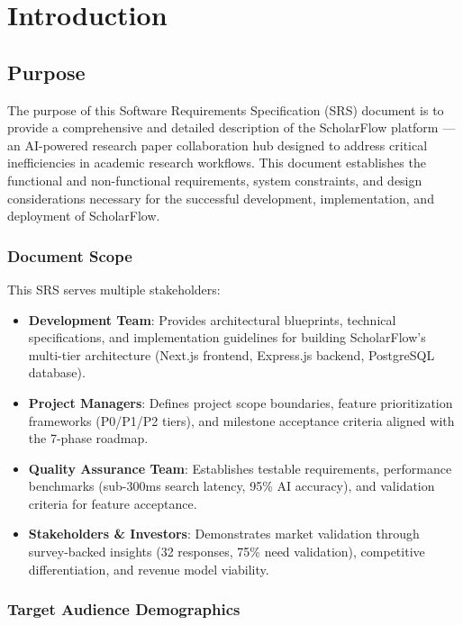 \chapter{Introduction}

\section{Purpose}

The purpose of this Software Requirements Specification (SRS) document is to provide a comprehensive and detailed description of the ScholarFlow platform --- an AI-powered research paper collaboration hub designed to address critical inefficiencies in academic research workflows. This document establishes the functional and non-functional requirements, system constraints, and design considerations necessary for the successful development, implementation, and deployment of ScholarFlow.

\subsection{Document Scope}

This SRS serves multiple stakeholders:

\begin{itemize}
    \item \textbf{Development Team}: Provides architectural blueprints, technical specifications, and implementation guidelines for building ScholarFlow's multi-tier architecture (Next.js frontend, Express.js backend, PostgreSQL database).
    \item \textbf{Project Managers}: Defines project scope boundaries, feature prioritization frameworks (P0/P1/P2 tiers), and milestone acceptance criteria aligned with the 7-phase roadmap.
    \item \textbf{Quality Assurance Team}: Establishes testable requirements, performance benchmarks (sub-300ms search latency, 95\% AI accuracy), and validation criteria for feature acceptance.
    \item \textbf{Stakeholders \& Investors}: Demonstrates market validation through survey-backed insights (32 responses, 75\% need validation), competitive differentiation, and revenue model viability.
\end{itemize}

\subsection{Target Audience Demographics}

